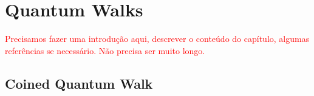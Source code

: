 	\chapter{Quantum Walks}
            \textcolor{red}{Precisamos fazer uma introdução aqui, descrever o conteúdo do capítulo, algumas referências se necessário. Não precisa ser muito longo.}
    	\section{Coined Quantum Walk}\label{coinedwalk}
 
    

    
    
